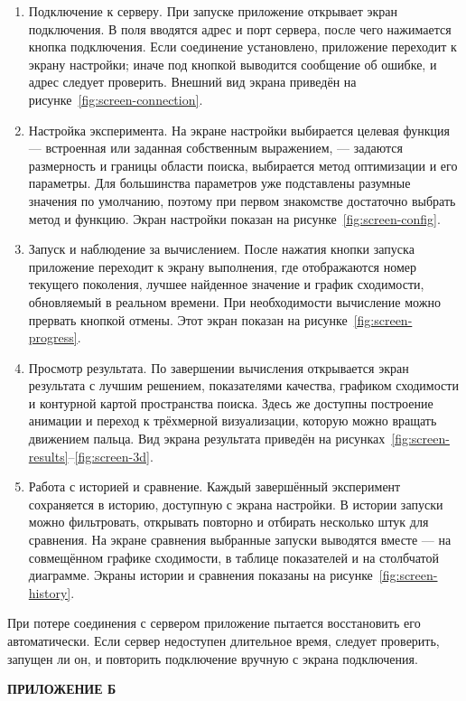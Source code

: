 \documentclass[14pt, a4paper]{extarticle}
\newcommand{\structelem}[1]{%
  \clearpage
  \phantomsection
  \addcontentsline{toc}{section}{#1}%
  \begin{center}\large\bfseries #1\end{center}
  \vspace{8pt}}
\begin{document}
\begin{enumerate}
  \item Подключение к серверу. При запуске приложение открывает экран подключения.
  В поля вводятся адрес и порт сервера, после чего нажимается кнопка подключения.
  Если соединение установлено, приложение переходит к экрану настройки; иначе под
  кнопкой выводится сообщение об ошибке, и адрес следует проверить. Внешний вид
  экрана приведён на рисунке~\ref{fig:screen-connection}.

  \item Настройка эксперимента. На экране настройки выбирается целевая функция ---
  встроенная или заданная собственным выражением, --- задаются размерность и
  границы области поиска, выбирается метод оптимизации и его параметры. Для
  большинства параметров уже подставлены разумные значения по умолчанию, поэтому
  при первом знакомстве достаточно выбрать метод и функцию. Экран настройки
  показан на рисунке~\ref{fig:screen-config}.

  \item Запуск и наблюдение за вычислением. После нажатия кнопки запуска приложение
  переходит к экрану выполнения, где отображаются номер текущего поколения, лучшее
  найденное значение и график сходимости, обновляемый в реальном времени. При
  необходимости вычисление можно прервать кнопкой отмены. Этот экран показан на
  рисунке~\ref{fig:screen-progress}.

  \item Просмотр результата. По завершении вычисления открывается экран результата
  с лучшим решением, показателями качества, графиком сходимости и контурной картой
  пространства поиска. Здесь же доступны построение анимации и переход к
  трёхмерной визуализации, которую можно вращать движением пальца. Вид экрана
  результата приведён на рисунках~\ref{fig:screen-results}--\ref{fig:screen-3d}.

  \item Работа с историей и сравнение. Каждый завершённый эксперимент сохраняется
  в историю, доступную с экрана настройки. В истории запуски можно фильтровать,
  открывать повторно и отбирать несколько штук для сравнения. На экране сравнения
  выбранные запуски выводятся вместе --- на совмещённом графике сходимости, в
  таблице показателей и на столбчатой диаграмме. Экраны истории и сравнения
  показаны на рисунке~\ref{fig:screen-history}.
\end{enumerate}

При потере соединения с сервером приложение пытается восстановить его
автоматически. Если сервер недоступен длительное время, следует проверить, запущен
ли он, и повторить подключение вручную с экрана подключения.

\structelem{ПРИЛОЖЕНИЕ Б}

 
\end{document}
